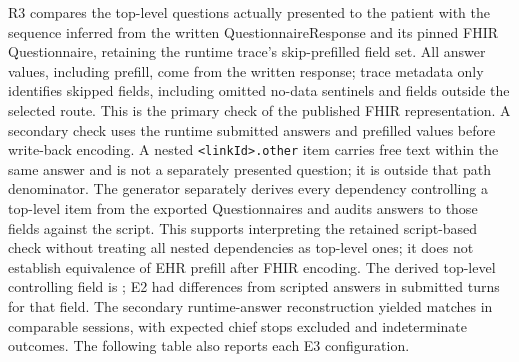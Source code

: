 R3 compares the top-level questions actually presented to the patient with the
sequence inferred from the written QuestionnaireResponse and its pinned FHIR
Questionnaire, retaining the runtime trace's skip-prefilled field set. All
answer values, including prefill, come from the written response; trace metadata
only identifies skipped fields, including omitted no-data sentinels and fields
outside the selected route.
This is the primary check of the published FHIR representation.
A secondary check uses the runtime submitted answers and prefilled values before
write-back encoding. A nested \texttt{<linkId>.other} item carries free text within the same
answer and is not a separately presented question; it is outside that path
denominator. The generator separately derives every dependency controlling a
top-level item from the exported Questionnaires and audits answers to those
fields against the script. This supports interpreting the retained script-based
check without treating all nested dependencies as top-level ones; it does not
establish equivalence of EHR prefill after FHIR encoding.
The derived top-level controlling field is \texttt{\ETwoFixtureControlFields{}};
E2 had \ETwoFixtureControlDiffer{} differences from scripted answers in
\ETwoFixtureControlTurns{} submitted turns for that field. The secondary
runtime-answer reconstruction yielded \ETwoFixtureActualPathAgree{} matches in
\ETwoFixtureActualPathCompared{} comparable sessions, with
\ETwoFixtureActualPathExcluded{} expected chief stops excluded and
\ETwoFixtureActualPathUnknown{} indeterminate outcomes. The following table
also reports each E3 configuration.

